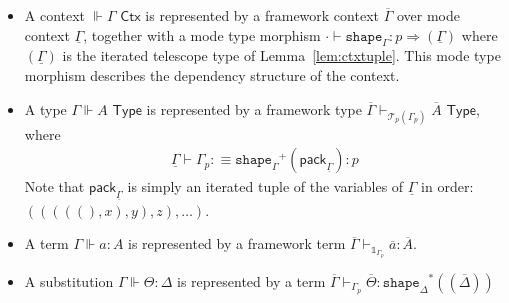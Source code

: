 \documentclass[10pt]{article}
\theoremstyle{definition}
\newcommand{\yields}{\vdash}
\newcommand{\tcell}{\Rightarrow}
\newcommand{\CTX}{\,\,\mathsf{Ctx}}
\newcommand{\TYPE}{\,\,\mathsf{Type}}
\newcommand\St[2]{\ensuremath{{#1}^*(#2)}}
\newcommand\TrPlus[2]{\ensuremath{{#1}^+(#2)}}
\newcommand\El[2]{\mathcal{T}_{#1}(#2)}
\newcommand\ctxtuple[1]{(#1)}
\newcommand\pack[1]{\ensuremath{\mathsf{pack}_{#1}}}
\newcommand{\modeof}[1]{{#1}_p}
\newcommand{\tshape}[1]{\ensuremath{\mathtt{shape}_{#1}}}
\newcommand{\qyields}{\Vdash}
\newcommand{\upstairs}[1]{\overline{#1}}
\newcommand{\downstairs}[1]{\underline{#1}}
\newcommand\One{\ensuremath{\mathds{1}}}
\begin{document}
\begin{itemize}
\item A context $\qyields \Gamma \CTX$ is represented by a framework context $\upstairs{\Gamma}$ over mode context $\downstairs{\Gamma}$, together with a mode type morphism $\cdot \yields \tshape{\Gamma} : p \tcell \ctxtuple{\downstairs{\Gamma}}$ where $\ctxtuple{\downstairs{\Gamma}}$ is the iterated telescope type of Lemma~\ref{lem:ctxtuple}. This mode type morphism describes the dependency structure of the context.
\item A type $\Gamma \qyields A \TYPE$ is represented by a framework type $\upstairs{\Gamma} \yields_{\El{p}{\modeof{\Gamma}}} \upstairs{A} \TYPE$, where
\begin{align*}
\downstairs{\Gamma} \yields \modeof{\Gamma} :\equiv \TrPlus{\tshape{\Gamma}}{\pack{\downstairs{\Gamma}}} : p
\end{align*}
Note that $\pack{\downstairs{\Gamma}}$ is simply an iterated tuple of the variables of $\downstairs{\Gamma}$ in order: $(((((), x), y), z), \dots)$.
\item A term $\Gamma \qyields a : A$ is represented by a framework term $\upstairs{\Gamma} \yields_{\One_{\modeof{\Gamma}}} \upstairs{a} : \upstairs{A}$.
\item A substitution $\Gamma \qyields \Theta : \Delta$ is represented by a term $\upstairs{\Gamma} \yields_{\modeof{\Gamma}} \upstairs{\Theta} : \St{\tshape{\Delta}}{\ctxtuple{\upstairs{\Delta}}}$
\end{itemize}
\end{document}
